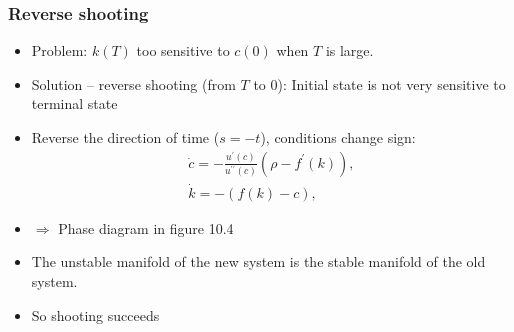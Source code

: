 \documentclass[bigger,handout]{beamer}
\newenvironment{stepitemize}{\begin{itemize}[<+->]}{\end{itemize} }
\begin{document}
\begin{frame}%
 
\frametitle{Reverse shooting}

\begin{stepitemize}
\item Problem: $k(T)$ too sensitive to $c(0)$ when $T$ is large.

\item Solution -- reverse shooting (from $T$ to $0$): \newline
Initial state is not very sensitive to terminal state

\item Reverse the direction of time ($s=-t$), conditions change sign: 
\begin{gather*}
\dot{c}=-\frac{u^{\prime }(c)}{u^{\prime \prime }(c)}\left( \rho -f^{\prime
}(k)\right) , \\
\dot{k}=-\left( f(k)-c\right) ,
\end{gather*}

\item $\Rightarrow $ Phase diagram in figure 10.4

\item The unstable manifold of the new system \newline
is the stable manifold of the old system.

\item So shooting succeeds
\end{stepitemize}

 
 
\end{frame}%
\end{document}
